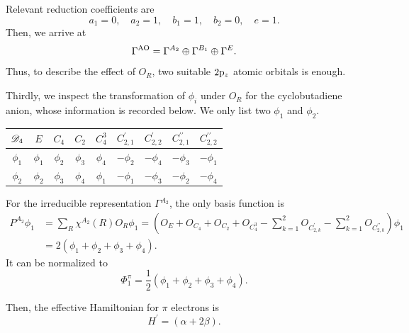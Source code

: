 \documentclass[a4paper]{book}
\newcommand{\AO}{{\rm AO}}
\newcommand{\orb}[1]{{\rm #1}}
\newcommand{\orbp}{\orb{p}}
\begin{document}
\begin{solution}
\begin{enumerate}[label=(\alph*)]
		Relevant reduction coefficients are
		\begin{equation*}
		a_1 = 0, \quad a_2 = 1, \quad b_1 = 1, \quad b_2 = 0, \quad e = 1.
		\end{equation*}
		Then, we arrive at		
		\begin{equation*}
			\Gamma^{\AO} = \Gamma^{A_2} \oplus \Gamma^{B_1} \oplus \Gamma^{E}.
		\end{equation*}
		Thus, to describe the effect of $O_R$, two suitable $2\orbp_{z}$ atomic orbitals is enough. 
		
		Thirdly, we inspect the transformation of $\phi_i$ under $O_R$ for the cyclobutadiene anion, whose information is recorded below. We only list two $\phi_1$ and $\phi_2$.
		\begin{center}
		\setlength{\abovecaptionskip}{-0.5em}
		\begin{tabular}{ccccccccc}\hline
	$\mathscr{D}_{\rm 4}$ & $E$ & $C_4$ & $C_2$ & $C^3_4$	&	$C^\prime_{2,1}$	&	$C^\prime_{2,2}$ &	$C^{\prime\prime}_{2,1}$	&	$C^{\prime\prime}_{2,2}$	\\ \hline
			$\phi_1$	&	$\phi_1$	&	$\phi_2$	&	$\phi_3$	&	$\phi_4$	&	$-\phi_2$	&	$-\phi_4$	&	$-\phi_3$	&	$-\phi_1$	\\
			$\phi_2$	&	$\phi_2$	&	$\phi_3$	&	$\phi_4$	&	$\phi_1$	&	$-\phi_1$	&	$-\phi_3$	&	$-\phi_2$	&	$-\phi_4$	\\ \hline
		\end{tabular}
		\end{center}
		
		For the irreducible representation $\Gamma^{A_2}$, the only basis function is
		\begin{align*}
			P^{A_2}\phi_1 &= \sum_{R} \chi^{A_2}(R) O_R \phi_1 = (O_E + O_{C_4} + O_{C_2} + O_{C^3_4} - \sum_{k=1}^2 O_{C^\prime_{2,k}} -\sum_{k=1}^2 O_{C^{\prime\prime}_{2,k}} )\phi_1 \\
			&= 2(\phi_1+\phi_2+\phi_3+\phi_4).
		\end{align*}
		It can be normalized to
		\begin{equation}
			\Phi^\pi_1 = \frac{1}{2}(\phi_1+\phi_2+\phi_3+\phi_4).
		\end{equation}
		
		Then, the effective Hamiltonian for $\pi$ electrons is
		\begin{equation*}
			H^\prime = ( \alpha + 2\beta ).		
		\end{equation*}
		

\end{enumerate}
\end{solution}
\end{document}
